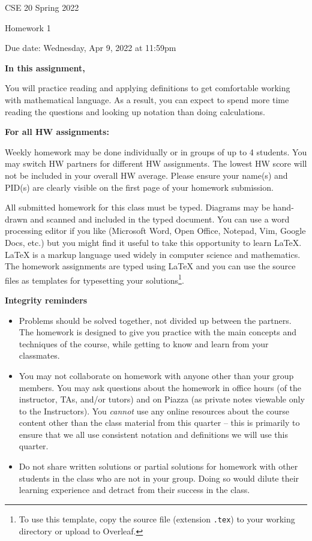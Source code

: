 \documentclass[10pt,letterpaper,unboxed,cm]{article}
\begin{document}
\hfill{CSE 20 Spring 2022}

\hfill{Homework 1}

\hfill{Due date: Wednesday, Apr 9, 2022 at 11:59pm}



{\bf In this assignment,}

You will practice reading and
applying definitions to get comfortable working with mathematical language. As
a result, you can expect to spend more time reading the questions and looking
up notation than doing calculations.


{\bf For all HW assignments:}

Weekly homework may be done individually or in groups of up to 4 students. 
You may switch HW partners for different HW assignments. 
The lowest HW score will not be included in your overall HW average. 
Please ensure your name(s) and PID(s) are clearly visible on the first page of your homework submission.

All submitted homework for this class must be typed. 
Diagrams may be hand-drawn and scanned and included in the typed document. 
You can use a word processing editor if you like (Microsoft Word, Open Office, Notepad, Vim, Google Docs, etc.) 
but you might find it useful to take this opportunity to learn LaTeX. 
LaTeX is a markup language used widely in computer science and mathematics. 
The homework assignments are typed using LaTeX and you can use the source files 
as templates for typesetting your solutions\footnote{To use this template, copy the source file (extension \texttt{.tex}) 
to your working directory or upload to Overleaf.}.

{\bf Integrity reminders}
\begin{itemize}
\item Problems should be solved together, not divided up between the partners. The homework is
designed to give you practice with the main concepts and techniques of the course, 
while getting to know and learn from your classmates.
\item You may not collaborate on homework with anyone other than your group members.
You may ask questions about the homework in office hours (of the instructor, TAs, and/or tutors) and 
on Piazza (as private notes viewable only to the Instructors).  
You \emph{cannot} use any online resources about the course content other than the class material 
from this quarter -- this is primarily to ensure that we all use consistent notation and
definitions we will use this quarter.
\item Do not share written solutions or partial solutions for homework with 
other students in the class who are not in your group. Doing so would dilute their learning 
experience and detract from their success in the class.
\end{itemize}
\end{document}
